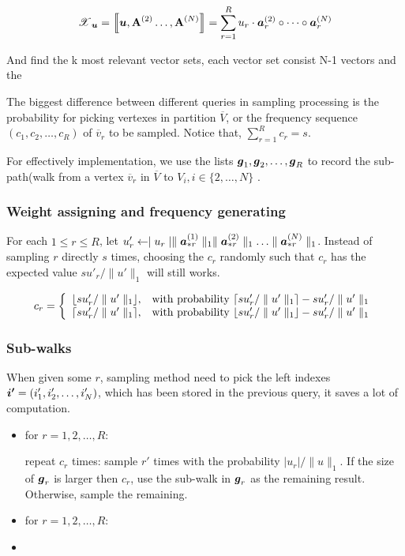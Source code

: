 \documentclass{article}
\newcommand{\T}[1]{\boldsymbol{\mathscr{\MakeUppercase{#1}}}}%
\newcommand{\V}[1]{{\bm{{\MakeLowercase{#1}}}}}%
\newcommand{\VnC}[3]{\V{#1}^{(#2)}_{#3}}%
\newcommand{\Vacol}[1]{\V{a}^{(#1)}_{*r}}
\newcommand{\M}[1]{{\bm{\mathbf{\MakeUppercase{#1}}}}}%
\newcommand{\Mn}[2]{\M{#1}^{(#2)}}%
\newcommand{\norm}[2]{\parallel#1\parallel_{#2}}
\newcommand{\KT}[1]{\left\llbracket #1 \right\rrbracket}
\begin{document}
\begin{equation}\label{eq:RankTensorCP}
\T{X}_{\V{u}}= \KT{ \V{u},\Mn{A}{2}\dots,\Mn{A}{N}} =
\sum_{r=1}^{R} u_r \cdot \VnC{A}{2}{r}\circ \cdots \circ \VnC{A}{N}{r}
\end{equation}

And find the k most relevant vector sets, each vector set consist N-1 vectors and the

The biggest difference between different queries in sampling processing is the probability for picking vertexes in partition $\overline{V}$, or the frequency sequence $(c_1,c_2,\ldots,c_R)$ of $\overline{v}_r$ to be sampled. Notice that, $\sum_{r=1}^{R}c_r = s$.

For effectively implementation, we use the lists $\V{g}_1,\V{g}_2,\ldots,\V{g}_R$ to record the sub-path(walk from a vertex $\overline{v}_r$ in $\overline{V}$ to $V_i,i\in\{2,\ldots,N\}$ .


\subsubsection{Weight assigning and frequency generating}
For each $1 \leq r \leq R$, let $u'_r \leftarrow \mid u_r\mid \norm{\Vacol{1}}{1} \norm{\Vacol{2}}{1} \ldots \norm{\Vacol{N}}{1}$.
Instead of sampling $r$ directly $s$ times, choosing the $c_r$ randomly such that $c_r$ has the expected value $su'_r/\norm{u'}{1}$ will still works.

 \begin{equation*}c_r=
    \left\{
      \begin{array}{ll}
        \lfloor su'_r/\norm{u'}{1} \rfloor,
        & \hbox{with probability $\lceil su'_r/\norm{u'}{1} \rceil - su'_r/\norm{u'}{1}$} \\
        \lceil su'_r/\norm{u'}{1} \rceil,
        & \hbox{with probability $\lfloor su'_r/\norm{u'}{1} \rfloor - su'_r/\norm{u'}{1}$}
      \end{array}
    \right.
    \end{equation*}

\subsubsection{Sub-walks}
When given some $r$, sampling method need to pick the left indexes $\V{i'} = (i'_1,i'_2,\ldots,i'_N)$, which has been stored in the previous query, it saves a lot of computation.
\begin{itemize}
  \item for $r = 1,2,\ldots,R$:

        repeat $c_r$ times: sample $r'$ times with the probability $|u_r|/\norm{u}{1}$. If the size of $\V{g}_r$ is larger then $c_r$, use the sub-walk in $\V{g}_r$ as the remaining result. Otherwise, sample the remaining.

  \item for $r = 1,2,\ldots,R$:

  \item
\end{itemize}
\end{document}
